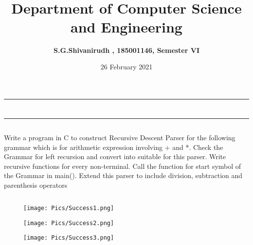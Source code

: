 \documentclass[12pt,letterpaper]{article}
\title{\textbf{Department of Computer Science and Engineering}}
\author{\textbf{S.G.Shivanirudh , 185001146, Semester VI }}
\date{26 February 2021}
\begin{document}
\maketitle
\hrule
\section*{}
\hrule 
\bigskip\bigskip

\subsection*{}

\subsection*{}
\begin{flushleft}
    Write a program in C to construct Recursive Descent Parser for the following grammar which is for arithmetic expression involving + and   *.
    Check the   Grammar   for   left   recursion   and   convert   into suitable for this parser. 
    Write recursive functions for every non-terminal.   Call   the   function   for   start   symbol   of   the   Grammar   in main().
    Extend this parser to include division, subtraction and parenthesis operators
\end{flushleft}

\subsection*{}
\begin{flushleft}

\end{flushleft}

\newpage
\subsection*{}
\subsubsection*{}
\begin{figure}[h]
    \centering
    \texttt{[image: Pics/Success1.png]}
\end{figure}
\begin{figure}
    \centering
    \texttt{[image: Pics/Success2.png]}
\end{figure}
\begin{figure}
    \centering
    \texttt{[image: Pics/Success3.png]}
\end{figure}
\end{document}
